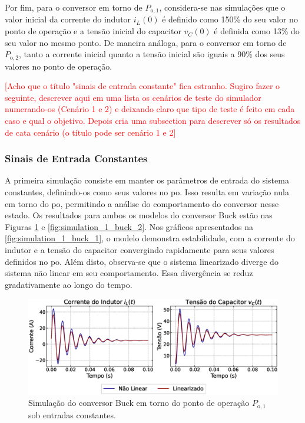 Por fim, para o conversor em torno de $P_{\mathrm{o}, 1}$, considera-se nas simulações que o valor inicial da corrente do indutor $i_L(0)$ é definido como 150\% do seu valor no ponto de operação e a tensão inicial do capacitor $v_C(0)$ é definida como 13\% do seu valor no mesmo ponto. De maneira análoga, para o conversor em torno de $P_{\mathrm{o}, 2}$, tanto a corrente inicial quanto a tensão inicial são iguais a 90\% dos seus valores no ponto de operação.

\textcolor{red}{[Acho que o título "sinais de entrada constante" fica estranho. Sugiro fazer o seguinte, descrever aqui em uma lista os cenários de teste do simulador numerando-os (Cenário 1 e 2) e deixando claro que tipo de teste é feito em cada caso e qual o objetivo. Depois cria uma subsection para descrever só os resultados de cata cenário (o título pode ser cenário 1 e 2]}

\subsubsection{Sinais de Entrada Constantes}

A primeira simulação consiste em manter os parâmetros de entrada do sistema constantes, definindo-os como seus valores no \acrshort{po}. Isso resulta em variação nula em torno do \acrshort{po}, permitindo a análise do comportamento do conversor nesse estado. Os resultados para ambos os modelos do conversor Buck estão nas Figuras \ref{fig:simulation_1_buck_1} e \ref{fig:simulation_1_buck_2}. Nos gráficos apresentados na \autoref{fig:simulation_1_buck_1}, o modelo demonstra estabilidade, com a corrente do indutor e a tensão do capacitor convergindo rapidamente para seus valores definidos no \acrshort{po}. Além disto, observa-se que o sistema linearizado diverge do sistema não linear em seu comportamento. Essa divergência se reduz gradativamente ao longo do tempo.

\begin{figure}[H]
  \centering
  \captionsetup{justification=centering}
  \includegraphics[width=1.\textwidth]{figuras/buck/sim1/op1/result.eps}
  \caption{Simulação do conversor Buck em torno do ponto de operação $P_{\mathrm{o}, 1}$ sob entradas constantes.}
  \label{fig:simulation_1_buck_1}
\end{figure}

